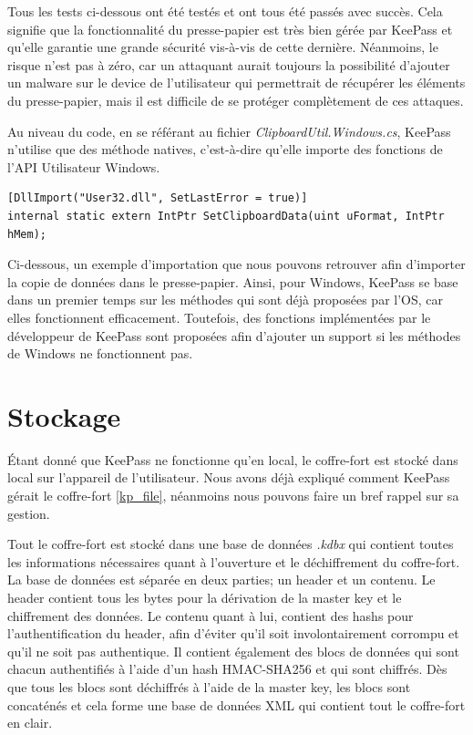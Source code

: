 Tous les tests ci-dessous ont été testés et ont tous été passés avec succès. Cela signifie que la fonctionnalité du presse-papier est très bien gérée par KeePass et qu'elle garantie une grande sécurité vis-à-vis de cette dernière. Néanmoins, le risque n'est pas à zéro, car un attaquant aurait toujours la possibilité d'ajouter un malware sur le device de l'utilisateur qui permettrait de récupérer les éléments du presse-papier, mais il est difficile de se protéger complètement de ces attaques. 

Au niveau du code, en se référant au fichier \textit{ClipboardUtil.Windows.cs}, KeePass n'utilise que des méthode natives, c'est-à-dire qu'elle importe des fonctions de l'API Utilisateur Windows.

\begin{lstlisting}[style=c, caption=Importation des méthodes natives de l'API de Windows]
[DllImport("User32.dll", SetLastError = true)]
internal static extern IntPtr SetClipboardData(uint uFormat, IntPtr hMem);
\end{lstlisting}
Ci-dessous, un exemple d'importation que nous pouvons retrouver afin d'importer la copie de données dans le presse-papier. Ainsi, pour Windows, KeePass se base dans un premier temps sur les méthodes qui sont déjà proposées par l'OS, car elles fonctionnent efficacement. Toutefois, des fonctions implémentées par le développeur de KeePass sont proposées afin d'ajouter un support si les méthodes de Windows ne fonctionnent pas. 

\section{Stockage}

Étant donné que KeePass ne fonctionne qu'en local, le coffre-fort est stocké dans local sur l'appareil de l'utilisateur. Nous avons déjà expliqué comment KeePass gérait le coffre-fort \ref{kp_file}, néanmoins nous pouvons faire un bref rappel sur sa gestion. 

Tout le coffre-fort est stocké dans une base de données \textit{.kdbx} qui contient toutes les informations nécessaires quant à l'ouverture et le déchiffrement du coffre-fort. La base de données est séparée en deux parties; un header et un contenu. Le header contient tous les bytes pour la dérivation de la master key et le chiffrement des données. Le contenu quant à lui, contient des hashs pour l'authentification du header, afin d'éviter qu'il soit involontairement corrompu et qu'il ne soit pas authentique. Il contient également des blocs de données qui sont chacun authentifiés à l'aide d'un hash HMAC-SHA256 et qui sont chiffrés. Dès que tous les blocs sont déchiffrés à l'aide de la master key, les blocs sont concaténés et cela forme une base de données XML qui contient tout le coffre-fort en clair. 

